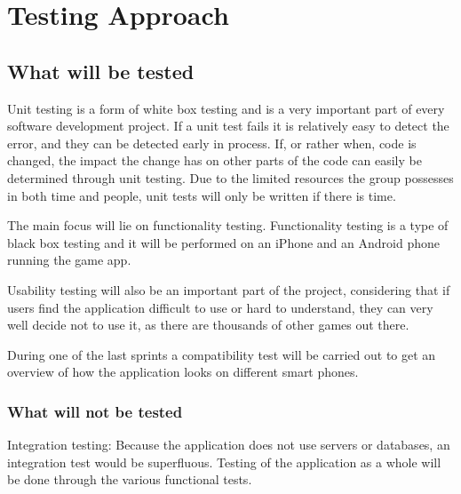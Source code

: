 \section{Testing Approach}

\subsection{What will be tested}

	Unit testing is a form of white box testing and is a very important part of every software development project. If a unit test fails it is relatively easy to detect the error, and they can be detected early in process. If, or rather when, code is changed, the impact the change has on other parts of the code can easily be determined through unit testing. Due to the limited resources the group possesses in both time and people, unit tests will only be written if there is time. 

	The main focus will lie on functionality testing. Functionality testing is a type of black box testing and it will be performed on an iPhone and an Android phone running the game app.

	Usability testing will also be an important part of the project, considering that if users find the application difficult to use or hard to understand, they can very well decide not to use it, as there are thousands of other games out there.

	During one of the last sprints a compatibility test will be carried out to get an overview of how the application looks on different smart phones.

\subsubsection{What will not be tested}

	Integration testing: Because the application does not use servers or databases, an integration test would be superfluous. Testing of the application as a whole will be done through the various functional tests.
